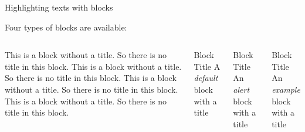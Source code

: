 \documentclass[12pt]{beamer}
\begin{document}
\begin{frame}{Highlighting texts with blocks}

Four types of blocks are available:
\bigskip

\begin{columns}
		\begin{block}{}
		This is a block without a title. So there is no title in this block. This is a block without a title. So there is no title in this block. This is a block without a title. So there is no title in this block. This is a block without a title. So there is no title in this block. 

		\end{block}
		\begin{block}{Block Title}
		A \emph{default} block with a title
		\end{block}

		\begin{alertblock}{Block Title}
		An \emph{alert} block with a title
		\end{alertblock}

		\begin{exampleblock}{Block Title}
		An \emph{example} block with a title
		\end{exampleblock}
\end{columns} 
\end{frame}
\end{document}
